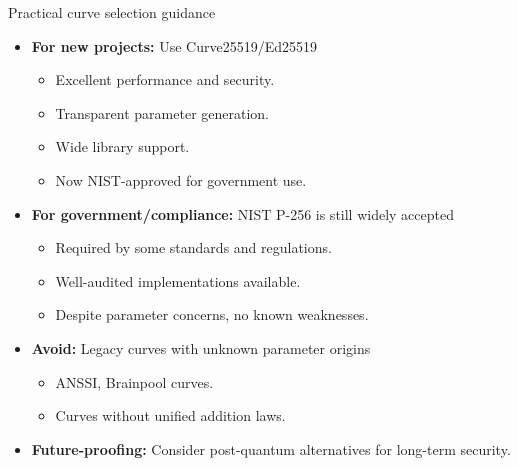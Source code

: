 \documentclass[aspectratio=169, lualatex, handout]{beamer}
\begin{document}
\begin{frame}{Practical curve selection guidance}
	\begin{itemize}
		\item \textbf{For new projects:} Use Curve25519/Ed25519
		      \begin{itemize}
			      \item Excellent performance and security.
			      \item Transparent parameter generation.
			      \item Wide library support.
			      \item Now NIST-approved for government use.
		      \end{itemize}
		\item \textbf{For government/compliance:} NIST P-256 is still widely accepted
		      \begin{itemize}
			      \item Required by some standards and regulations.
			      \item Well-audited implementations available.
			      \item Despite parameter concerns, no known weaknesses.
		      \end{itemize}
		\item \textbf{Avoid:} Legacy curves with unknown parameter origins
		      \begin{itemize}
			      \item ANSSI, Brainpool curves.
			      \item Curves without unified addition laws.
		      \end{itemize}
		\item \textbf{Future-proofing:} Consider post-quantum alternatives for long-term security.
	\end{itemize}
\end{frame}
\end{document}
